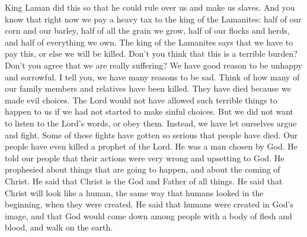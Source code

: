 King Laman did this so that he could rule over us and make us slaves. And you know that right now we pay a heavy tax to the king of the Lamanites: half of our corn and our barley, half of all the grain we grow, half of our flocks and herds, and half of everything we own. The king of the Lamanites says that we have to pay this, or else we will be killed.
\bverse \iffalse And now, is not this grievous to be borne? And is not this, our affliction, great? Now behold, how great reason we have to mourn. \fi
Don't you think that this is a terrible burden? Don't you agree that we are really suffering? We have good reason to be unhappy and sorrowful.
\bverse \iffalse Yea, I say unto you, great are the reasons which we have to mourn; for behold how many of our brethren have been slain, and their blood has been spilt in vain, and all because of iniquity. \fi
I tell you, we have many reasons to be sad. Think of how many of our family members and relatives have been killed. They have died because we made evil choices.
\bverse \iffalse For if this people had not fallen into transgression the Lord would not have suffered that this great evil should come upon them. But behold, they would not hearken unto his words; but there arose contentions among them, even so much that they did shed blood among themselves. \fi
The Lord would not have allowed such terrible things to happen to us if we had not started to make sinful choices. But we did not want to listen to the Lord's words, or obey them. Instead, we have let ourselves argue and fight. Some of these fights have gotten so serious that people have died.
\bverse \iffalse And a prophet of the Lord have they slain; yea, a chosen man of God, who told them of their wickedness and abominations, and prophesied of many things which are to come, yea, even the coming of Christ. \fi
Our people have even killed a prophet of the Lord. He was a man chosen by God. He told our people that their actions were very wrong and upsetting to God. He prophesied about things that are going to happen, and about the coming of Christ.
\bverse \iffalse And because he said unto them that Christ was the God, the Father of all things, and said that he should take upon him the image of man, and it should be the image after which man was created in the beginning; or in other words, he said that man was created after the image of God, and that God should come down among the children of men, and take upon him flesh and blood, and go forth upon the face of the earth-- \fi
He said that Christ is the God and Father of all things. He said that Christ will look like a human, the same way that humans looked in the beginning, when they were created. He said that humans were created in God's image, and that God would come down among people with a body of flesh and blood, and walk on the earth.

